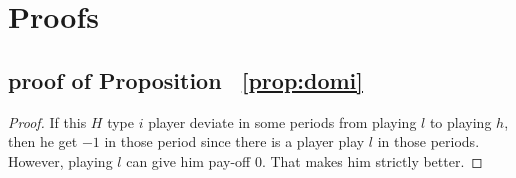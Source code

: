 \documentclass[12pt,letter]{article}
\theoremstyle{remark}
\theoremstyle{remark}
\theoremstyle{claim}
\begin{document}


\appendix



\section{Proofs}
\subsection{proof of Proposition ~\ref{prop:domi}}
\begin{proof}
If this $H$ type $i$ player deviate in some periods from playing $l$ to playing $h$, then he get $-1$ in those period since there is a player play $l$ in those periods. However, playing $l$ can give him pay-off $0$. That makes him strictly better. 
\end{proof}
\end{document}
